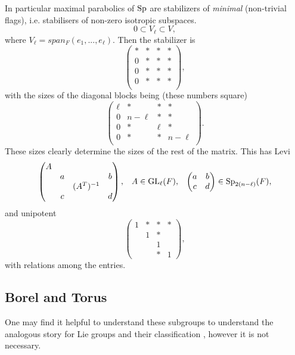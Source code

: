     \label{maximal_parabolic}
    In particular maximal parabolics of \(\operatorname{Sp}\) are stabilizers of \textit{minimal} (non-trivial flags), i.e. stabilisers of non-zero isotropic subspaces.
    \[0 \subset V_\ell \subset V,\]
    where \(V_\ell = span_F(e_1, ..., e_\ell)\). Then the stabilizer is 
    \[\begin{pmatrix}
        * &*&*&* \\
        0 &*&*&* \\
        0 &*&*&* \\
        0 &*&*&* \\
    \end{pmatrix},\]
    with the sizes of the diagonal blocks being (these numbers square)
    \[\begin{pmatrix}
        \ell &*&*&* \\
        0 &n-\ell&*&* \\
        0 &*&\ell&* \\
        0 &*&*&n-\ell \\
    \end{pmatrix}.\]
    These sizes clearly determine the sizes of the rest of the matrix. This has Levi
    \[\begin{pmatrix}
        A &&& \\
         &a&&b \\
         &&(A^T)^{-1}& \\
         &c&&d \\
    \end{pmatrix}, \;\;\; A\in \operatorname{GL}_\ell(F), \;\;\; \begin{pmatrix}
        a & b\\
        c & d \\
    \end{pmatrix} \in \operatorname{Sp}_{2(n-\ell)}(F),\]
    and unipotent 
    \[\begin{pmatrix}
        1 &*&*&* \\
        & 1&*& \\
        && 1& \\
        &&*&1
    \end{pmatrix},\]
    with relations among the entries.

    \subsection{Borel and Torus}
    One may find it helpful to understand these subgroups to understand the analogous story for Lie groups and their classification \cite{hallLieGroupsLie2015}, however it is not necessary. 

